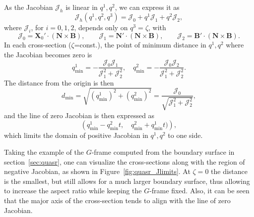 \documentclass[12pt]{iopart}
\newcommand\hladdedrev[1]{#1} %
\newcommand\dd[2]{\frac{d #1}{d #2}}
\newcommand\ddp[2]{\frac{\partial #1}{\partial #2}}
\newcommand\X{{\bm{X}}_0}
\newcommand\Xp{\X'}
\newcommand\Nnew{{\bm N}}
\newcommand\Bnew{{\bm B}}
\newcommand\GFF{$G$-frame}
\newcommand{\Jh}{\mathcal{J}_h}
\begin{document}
\hladdedrev{As the Jacobian $\Jh$ is linear in $q^1,q^2$, we can express it as
\begin{equation}
   \Jh(q^1,q^2,q^3) = \mathcal{J}_0 + q^1 \mathcal{J}_1 + q^2 \mathcal{J}_2, 
\end{equation}
where $\mathcal{J}_i$, for $i = 0,1,2$, depends only on $q^3 = \zeta$, with
\begin{equation}
\mathcal{J}_0 = \Xp\cdot(\Nnew\times \Bnew), \qquad \mathcal{J}_1 = \Nnew'\cdot(\Nnew\times \Bnew), \qquad \mathcal{J}_2 = \Bnew'\cdot(\Nnew\times \Bnew).
\end{equation}
In each cross-section ($\zeta$=const.), the point of minimum distance in $q^1,q^2$ where the Jacobian becomes zero is
\begin{equation}
   q^1_{\text{min}} = -\frac{\mathcal{J}_0 \mathcal{J}_1 }{ \mathcal{J}_1^2 + \mathcal{J}_2^2}, \quad
   q^2_{\text{min}} = -\frac{\mathcal{J}_0 \mathcal{J}_2 }{ \mathcal{J}_1^2 + \mathcal{J}_2^2}. 
\end{equation}
The distance from the origin is then 
\begin{equation}
    d_\text{min}=\sqrt{(q^1_\text{min})^2+(q^2_\text{min})^2} = \frac{ \mathcal{J}_0 }{\sqrt{ \mathcal{J}_1^2 + \mathcal{J}_2^2}},
\end{equation}
 and the line of zero Jacobian is then expressed as 
\begin{equation}
    \left(q^1_\text{min} -q^2_\text{min} t, \quad q^2_\text{min} +q^1_\text{min} t)\right),
\end{equation}
which limits the domain of positive Jacobian in $q^1,q^2$ to one side.
}%


\hladdedrev{Taking the example of the \GFF{} computed from the boundary surface in section~\ref{sec:quasr}, one can visualize the cross-sections along with the region of negative Jacobian, as shown in Figure~\ref{fig:quasr_Jlimits}. At $\zeta=0$ the distance is the smallest, but still allows for a much larger boundary surface, thus allowing to increase the aspect ratio while keeping the \GFF{} fixed. Also, it can be seen that the major axis of the cross-section tends to align with the line of zero Jacobian.
}%
\end{document}
